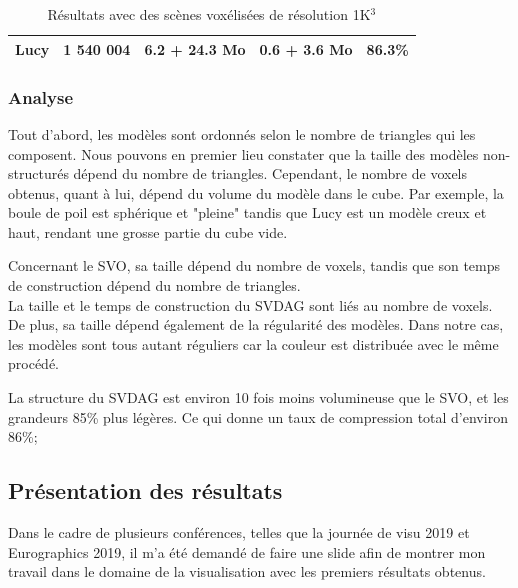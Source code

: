 \documentclass[12pt,a4paper,twoside]{article}
\begin{document}
\begin{table}[H]
\begin{tabular}{lllll}
            \multicolumn{1}{|l|}{Lucy}     & \multicolumn{1}{l|}{1 540 004}                                                  & \multicolumn{1}{l|}{6.2 + 24.3 Mo}                                                              & \multicolumn{1}{l|}{0.6 + 3.6 Mo}                                                                 & \multicolumn{1}{l|}{86.3\%}                                                            \\ \hline
        \end{tabular}
        \caption{Résultats avec des scènes voxélisées de résolution 1K$^{3}$}
    \end{table}

    \newpage
    \subsubsection{Analyse}

    Tout d'abord, les modèles sont ordonnés selon le nombre de triangles qui les composent.
    Nous pouvons en premier lieu constater que la taille des modèles non-structurés dépend du nombre de triangles.
    Cependant, le nombre de voxels obtenus, quant à lui, dépend du volume du modèle dans le cube.
    Par exemple, la boule de poil est sphérique et "pleine" tandis que Lucy est un modèle creux et haut, rendant une grosse partie du cube vide.

    Concernant le SVO, sa taille dépend du nombre de voxels, tandis que son temps de construction dépend du nombre de triangles.\\
    La taille et le temps de construction du SVDAG sont liés au nombre de voxels. De plus, sa taille dépend également de la régularité des modèles.
    Dans notre cas, les modèles sont tous autant réguliers car la couleur est distribuée avec le même procédé.

    La structure du SVDAG est environ 10 fois moins volumineuse que le SVO, et les grandeurs 85\% plus légères. Ce qui donne un taux de compression total d'environ 86\%;

    \subsection{Présentation des résultats}

    Dans le cadre de plusieurs conférences, telles que la journée de visu 2019 et Eurographics 2019, il m'a été
    demandé de faire une slide afin de montrer mon travail dans le domaine de la visualisation avec les premiers résultats obtenus.
\end{document}
